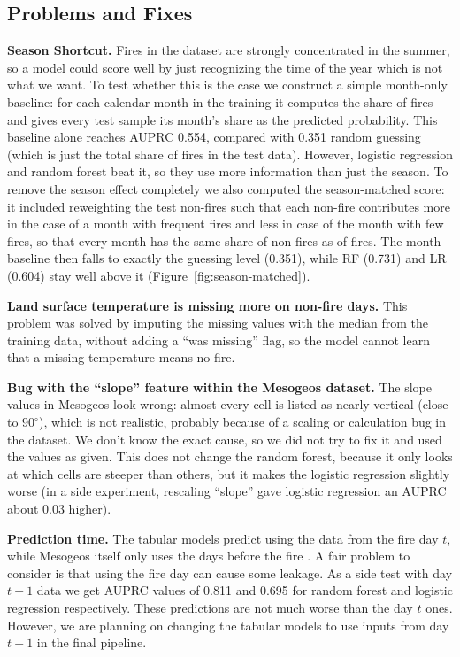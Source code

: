 \subsection{Problems and Fixes}
\textbf{Season Shortcut.}
  Fires in the dataset are strongly concentrated in the summer, so a model could score well by just recognizing the time of the year which is not what we want. To test whether this is the case we construct a simple month-only baseline: for each calendar month in the training it computes the share of fires and gives every test sample its month's share as the predicted probability. This baseline alone reaches AUPRC 0.554, compared with 0.351 random guessing (which is just the total share of fires in the test data). However, logistic regression and random forest beat it, so they use more information than just the season. To remove the season effect completely we also computed the season-matched score: it included reweighting the test non-fires such that each non-fire contributes more in the case of a month with frequent fires and less in case of the month with few fires, so that every month has the same share of non-fires as of fires. The month baseline then falls to exactly the guessing level (0.351), while RF (0.731) and LR (0.604) stay well above it (Figure~\ref{fig:season-matched}).

  
  \textbf{Land surface temperature is missing more on non-fire days.}
  This problem was solved by imputing the missing values with the median from the training data, without adding a ``was missing'' flag, so the model cannot learn that a missing temperature means no fire.

  
  \textbf{Bug with the ``slope'' feature within the Mesogeos dataset.}
  The slope values in Mesogeos look wrong: almost every cell is listed as nearly vertical (close to $90^\circ$), which is not realistic, probably because of a scaling or calculation bug in the dataset. We don't know the exact cause, so we did not try to fix it and used the values as given. This does not change the random forest, because it only looks at which cells are steeper than others, but it makes the logistic regression slightly worse (in a side experiment, rescaling ``slope'' gave logistic regression an AUPRC about 0.03 higher).

  
  \textbf{Prediction time.}
  The tabular models predict using the data from the fire day $t$, while Mesogeos itself only uses the days before the fire \cite{kondylatos2023mesogeos}. A fair problem to consider is that using the fire day can cause some leakage. As a side test with day $t-1$ data we get AUPRC values of 0.811 and 0.695 for random forest and logistic regression respectively. These predictions are not much worse than the day $t$ ones. However, we are planning on changing the tabular models to use inputs from day $t-1$ in the final pipeline.


